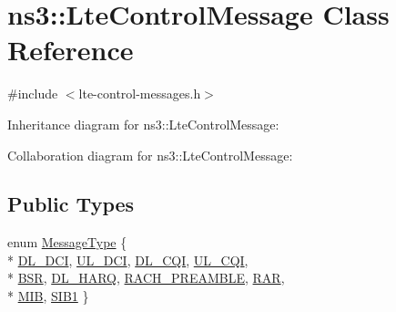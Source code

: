 \hypertarget{classns3_1_1LteControlMessage}{}\section{ns3\+:\+:Lte\+Control\+Message Class Reference}
\label{classns3_1_1LteControlMessage}


{\ttfamily \#include $<$lte-\/control-\/messages.\+h$>$}



Inheritance diagram for ns3\+:\+:Lte\+Control\+Message\+:


Collaboration diagram for ns3\+:\+:Lte\+Control\+Message\+:
\subsection*{Public Types}
\begin{DoxyCompactItemize}
\item 
enum \hyperlink{classns3_1_1LteControlMessage_a9f9798d5aa8ad40f6432285b4b06135b}{Message\+Type} \{ \\*
\hyperlink{classns3_1_1LteControlMessage_a9f9798d5aa8ad40f6432285b4b06135ba9cd550d54eff16dc9f72579d925d72ff}{D\+L\+\_\+\+D\+CI}, 
\hyperlink{classns3_1_1LteControlMessage_a9f9798d5aa8ad40f6432285b4b06135bab9cab20479fe8288477132799afcab91}{U\+L\+\_\+\+D\+CI}, 
\hyperlink{classns3_1_1LteControlMessage_a9f9798d5aa8ad40f6432285b4b06135ba10d476b2cfd1b772dd6364fc1b752aa3}{D\+L\+\_\+\+C\+QI}, 
\hyperlink{classns3_1_1LteControlMessage_a9f9798d5aa8ad40f6432285b4b06135baee84c20dcae951bac4fe17bb9b22baa0}{U\+L\+\_\+\+C\+QI}, 
\\*
\hyperlink{classns3_1_1LteControlMessage_a9f9798d5aa8ad40f6432285b4b06135bac8c418b47c2ff9a59c75df7be42ff7bd}{B\+SR}, 
\hyperlink{classns3_1_1LteControlMessage_a9f9798d5aa8ad40f6432285b4b06135bace263f46a89d51c7ff09069c623e35d6}{D\+L\+\_\+\+H\+A\+RQ}, 
\hyperlink{classns3_1_1LteControlMessage_a9f9798d5aa8ad40f6432285b4b06135ba6b065fc9e647392aec348af9eda0bcea}{R\+A\+C\+H\+\_\+\+P\+R\+E\+A\+M\+B\+LE}, 
\hyperlink{classns3_1_1LteControlMessage_a9f9798d5aa8ad40f6432285b4b06135ba32e0d29cd217b256852ae7e843c932ed}{R\+AR}, 
\\*
\hyperlink{classns3_1_1LteControlMessage_a9f9798d5aa8ad40f6432285b4b06135ba4dabc967ab045bb1e5e9c2060b0d9a8d}{M\+IB}, 
\hyperlink{classns3_1_1LteControlMessage_a9f9798d5aa8ad40f6432285b4b06135ba09434c7ac463bc1bf439d10e5c1cb164}{S\+I\+B1}
 \}
\end{DoxyCompactItemize}
